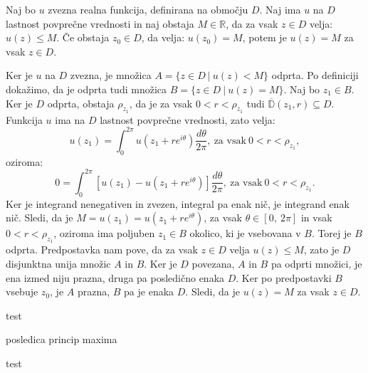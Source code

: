 \documentclass[mat1]{fmfdelo}
\begin{document}
    \begin{lema}
        Naj bo $u$ zvezna realna funkcija, definirana na območju $D$. Naj ima $u$ na $D$ lastnost povprečne vrednosti in naj obstaja $M \in \mathbb{R}$, da za vsak $z \in D$ velja: $u(z) \leq M$. 
        Če obstaja $z_0 \in D$, da velja: $u(z_0) = M$, potem je $u(z) = M$ za vsak $z \in D$.
    \end{lema}
    \begin{dokaz}
        Ker je $u$ na $D$ zvezna, je množica $A = \{z \in D~|~u(z) < M\}$ odprta. Po definiciji dokažimo, da je odprta tudi množica $B = \{z \in D~|~u(z) = M\}$. Naj bo $z_1 \in B$. Ker je $D$ odprta, obstaja $\rho_{z_1}$, da je za vsak $0 < r < \rho_{z_1}$ tudi $\overline{\mathbb{D}}(z_1, r) \subseteq D$. 
        Funkcija $u$ ima na $D$ lastnost povprečne vrednosti, zato velja:
        $$
            u(z_1) = \int_{0}^{2\pi}{u(z_1 + re^{i\theta}) \frac{d\theta}{2\pi}},~\text{za vsak}~0<r<\rho_{z_1}, 
        $$
        oziroma: 
        $$
        0 = \int_{0}^{2\pi}{\left[u(z_1) - u(z_1 + re^{i\theta}) \right]\frac{d\theta}{2\pi}},~\text{za vsak}~0<r<\rho_{z_1}.
        $$
        Ker je integrand nenegativen in zvezen, integral pa enak nič, je integrand enak nič. 
        Sledi, da je $M = u(z_1) = u(z_1 + r e^{i \theta})$, za vsak $\theta \in [0,~2\pi]$ in vsak $0 < r < \rho_{z_1}$, oziroma ima poljuben $z_1 \in B$ okolico, ki je vsebovana v $B$. Torej je $B$ odprta.
        Predpostavka nam pove, da za vsak $z \in D$ velja $u(z) \leq M$, zato je $D$ disjunktna unija množic $A$ in $B$. Ker je $D$ povezana, $A$ in $B$ pa odprti množici, je ena izmed niju prazna, druga pa posledično enaka $D$. Ker po predpostavki $B$ vsebuje $z_0$, je $A$ prazna, $B$ pa je enaka $D$. Sledi, da je $u(z) = M$ za vsak $z \in D$. 
    \end{dokaz}

    \begin{trditev}
        
    \end{trditev}
    \begin{dokaz}
        test
    \end{dokaz}

    \begin{trditev}
        posledica princip maxima
    \end{trditev}
    \begin{dokaz}
        test
    \end{dokaz}
\end{document}
